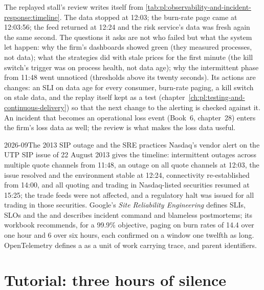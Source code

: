 The replayed stall's review writes itself from \cref{tab:pl:observability-and-incident-response:timeline}. The data stopped at 12:03; the
burn-rate page came at 12:03:56; the feed returned at 12:24 and the risk service's data was fresh again the same second. The questions it asks are
not who failed but what the system let happen: why the firm's dashboards showed green (they measured processes, not data); what the strategies
did with stale prices for the first minute (the kill switch's trigger was on process health, not data age); why the intermittent phase from
11:48 went unnoticed (thresholds above its twenty seconds). Its actions are changes: an SLI on data age for every consumer, burn-rate paging,
a kill switch on stale data, and the replay itself kept as a test (chapter~\ref{ch:pl:testing-and-continuous-delivery}) so that the next
change to the alerting is checked against it. An incident that becomes an operational loss event (Book~6, chapter~28) enters the firm's loss
data as well; the review is what makes the loss data useful.

\begin{dated}{2026-09}{The 2013 SIP outage and the SRE practices}\label{dat:pl:observability-and-incident-response:sip}
Nasdaq's vendor alert on the UTP SIP issue of 22 August 2013 gives the timeline: intermittent outages across multiple quote channels from
11:48, an outage on all quote channels at 12:03, the issue resolved and the environment stable at 12:24, connectivity re-established from
14:00, and all quoting and trading in Nasdaq-listed securities resumed at 15:25; the trade feeds were not affected, and a regulatory halt was
issued for all trading in those securities. Google's \emph{Site Reliability Engineering} defines SLIs, SLOs and the  and describes
incident command and blameless postmortems; its workbook recommends, for a 99.9\% objective, paging on burn rates of 14.4 over one hour and 6
over six hours, each confirmed on a window one twelfth as long. OpenTelemetry defines a  as a unit of work carrying trace,  and parent
identifiers.
\end{dated}

\section{Tutorial: three hours of silence}\label{tut:pl:observability-and-incident-response:tut}

